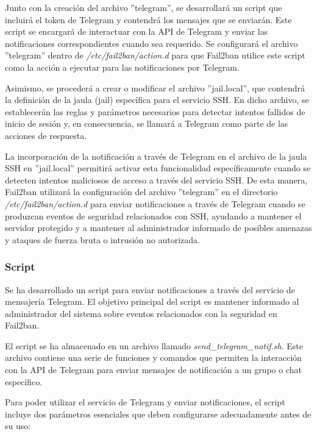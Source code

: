 			Junto con la creación del archivo ''telegram'', se desarrollará un script que incluirá el token de Telegram y contendrá los mensajes que se enviarán. Este script se encargará de interactuar con la API de Telegram y enviar las notificaciones correspondientes cuando sea requerido. Se configurará el archivo ''telegram'' dentro de \textit{/etc/fail2ban/action.d} para que Fail2ban utilice este script como la acción a ejecutar para las notificaciones por Telegram.
			
			Asimismo, se procederá a crear o modificar el archivo ''jail.local'', que contendrá la definición de la jaula (jail) específica para el servicio SSH. En dicho archivo, se establecerán las reglas y parámetros necesarios para detectar intentos fallidos de inicio de sesión y, en consecuencia, se llamará a Telegram como parte de las acciones de respuesta.
			
			La incorporación de la notificación a través de Telegram en el archivo de la jaula SSH en ''jail.local'' permitirá activar esta funcionalidad específicamente cuando se detecten intentos maliciosos de acceso a través del servicio SSH. De esta manera, Fail2ban utilizará la configuración del archivo ''telegram'' en el directorio \textit{/etc/fail2ban/action.d} para enviar notificaciones a través de Telegram cuando se produzcan eventos de seguridad relacionados con SSH, ayudando a mantener el servidor protegido y a mantener al administrador informado de posibles amenazas y ataques de fuerza bruta o intrusión no autorizada.\par
	
	\subsubsection{Script}
	
		Se ha desarrollado un script para enviar notificaciones a través del servicio de mensajería Telegram. El objetivo principal del script es mantener informado al administrador del sistema sobre eventos relacionados con la seguridad en Fail2ban.
		
		El script se ha almacenado en un archivo llamado \textit{send\_telegram\_notif.sh}. Este archivo contiene una serie de funciones y comandos que permiten la interacción con la API de Telegram para enviar mensajes de notificación a un grupo o chat específico.
		
		Para poder utilizar el servicio de Telegram y enviar notificaciones, el script incluye dos parámetros esenciales que deben configurarse adecuadamente antes de su uso:
		
